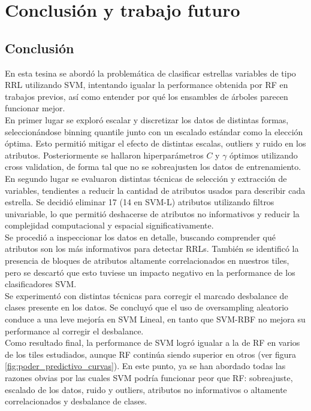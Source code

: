 \chapter{Conclusión y trabajo futuro}

\section{Conclusión}
En esta tesina se abordó la problemática de clasificar estrellas variables de tipo RRL utilizando SVM, intentando igualar la performance obtenida por RF en trabajos previos, así como entender por qué los ensambles de árboles parecen funcionar mejor. \\

En primer lugar se exploró escalar y discretizar los datos de distintas formas, seleccionándose binning quantile junto con un escalado estándar como la elección óptima. Esto permitió mitigar el efecto de distintas escalas, outliers y ruido en los atributos. Posteriormente se hallaron hiperparámetros $C$ y $\gamma$ óptimos utilizando cross validation, de forma tal que no se sobreajusten los datos de entrenamiento. \\

En segundo lugar se evaluaron distintas técnicas de selección y extracción de variables, tendientes a reducir la cantidad de atributos usados para describir cada estrella. Se decidió eliminar 17 (14 en SVM-L) atributos utilizando filtros univariable, lo que permitió deshacerse de atributos no informativos y reducir la complejidad computacional y espacial significativamente. \\

Se procedió a inspeccionar los datos en detalle, buscando comprender qué atributos son los más informativos para detectar RRLs. También se identificó la presencia de bloques de atributos altamente correlacionados en nuestros tiles, pero se descartó que esto tuviese un impacto negativo en la performance de los clasificadores SVM. \\

Se experimentó con distintas técnicas para corregir el marcado desbalance de clases presente en los datos. Se concluyó que el uso de oversampling aleatorio conduce a una leve mejoría en SVM Lineal, en tanto que SVM-RBF no mejora su performance al corregir el desbalance. \\

Como resultado final, la performance de SVM logró igualar a la de RF en varios de los tiles estudiados, aunque RF continúa siendo superior en otros (ver figura \ref{fig:poder_predictivo_curvas}). En este punto, ya se han abordado todas las razones obvias por las cuales SVM podría funcionar peor que RF: sobreajuste, escalado de los datos, ruido y outliers, atributos no informativos o altamente correlacionados y desbalance de clases. \\

